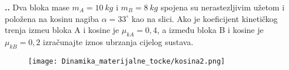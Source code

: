 

\noindent 
\textbf{
\thecjelina.\thezadatak.}
Dva bloka mase $m_A = 10\ kg$ i $m_B = 8\ kg$ spojena su nerastezljivim užetom i položena na kosinu
nagiba $\alpha = 33^\circ$ kao na slici. Ako je koeficijent kineti\v{c}kog trenja izme\dj{}u bloka A i kosine je 
$\mu_{kA} = 0,4$,
a između bloka B i kosine je $\mu_{kB} = 0,2$ izra\v{c}unajte iznos ubrzanja cijelog sustava.
\begin{figure}[h]%
  \begin{center}
    \texttt{[image: Dinamika\_materijalne\_tocke/kosina2.png]}
  \end{center}
\end{figure}

